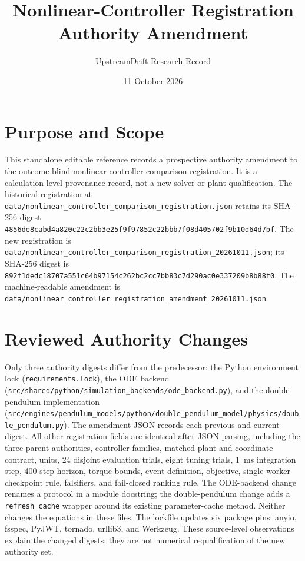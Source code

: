 \documentclass[11pt]{article}
\title{Nonlinear-Controller Registration Authority Amendment}
\author{UpstreamDrift Research Record}
\date{11 October 2026}
\begin{document}
\maketitle

\section*{Purpose and Scope}
This standalone editable reference records a prospective authority amendment to
the outcome-blind nonlinear-controller comparison registration. It is a
calculation-level provenance record, not a new solver or plant qualification.
The historical registration at
\texttt{data/nonlinear\_controller\_comparison\_registration.json} retains its
SHA-256 digest
\texttt{4856de8cabd4a820c22c2bb3e25f9f97852c22bbb7f08d405702f9b10d64d7bf}.
The new registration is
\texttt{data/nonlinear\_controller\_comparison\_registration\_20261011.json};
its SHA-256 digest is
\texttt{892f1dedc18707a551c64b97154c262bc2cc7bb83c7d290ac0e337209b8b88f0}.
The machine-readable amendment is
\texttt{data/nonlinear\_controller\_registration\_amendment\_20261011.json}.

\section*{Reviewed Authority Changes}
Only three authority digests differ from the predecessor: the Python
environment lock (\texttt{requirements.lock}), the ODE backend
(\texttt{src/shared/python/simulation\_backends/ode\_backend.py}), and the
double-pendulum implementation
(\texttt{src/engines/pendulum\_models/python/double\_pendulum\_model/physics/double\_pendulum.py}).
The amendment JSON records each previous and current digest. All other
registration fields are identical after JSON parsing, including the
three parent authorities, controller families, matched plant and coordinate
contract, units, 24 disjoint evaluation trials, eight tuning trials, 1~ms
integration step, 400-step horizon, torque bounds, event definition, objective,
single-worker checkpoint rule, falsifiers, and fail-closed ranking rule.
The ODE-backend change renames a protocol in a module docstring; the
double-pendulum change adds a \texttt{refresh\_cache} wrapper around its existing
parameter-cache method. Neither changes the equations in these files. The
lockfile updates six package pins: anyio, fsspec, PyJWT, tornado, urllib3,
and Werkzeug. These source-level observations explain the changed digests;
they are not numerical requalification of the new authority set.
\end{document}
